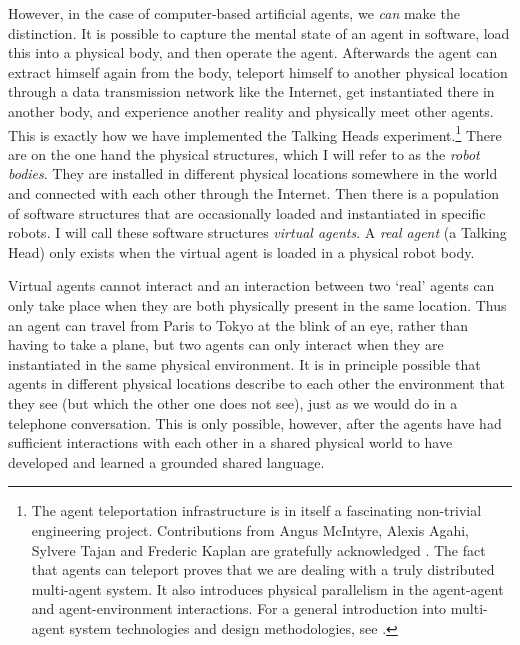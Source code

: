 However, in the case of computer-based 
artificial agents, we {\it can} 
make the distinction. It is possible to capture the mental state
of an agent in software, load this into a physical 
body, and then operate 
the agent. Afterwards the agent can extract himself
again from the body, teleport himself 
to another physical location through a data transmission network
like the Internet, get instantiated there in another
body, and experience another reality and physically meet
other agents. This is exactly how we have implemented the 
Talking Heads experiment.\footnote{
The agent teleportation infrastructure is in itself a 
fascinating non-trivial engineering project. Contributions 
from Angus McIntyre, Alexis Agahi, Sylvere Tajan and
Frederic Kaplan are gratefully acknowledged \cite{McIntyre:1999}. 
The fact that agents can teleport proves that we are dealing 
with a truly distributed multi-agent system. It also 
introduces physical parallelism in the agent-agent and 
agent-environment interactions. 
For a general introduction into multi-agent system
technologies and design methodologies, 
see \cite{Ferber:1999}.}
There are on the one hand
the physical structures, which I will refer to as the {\it
robot bodies}. They are installed in different physical 
locations somewhere in the world and connected
with each other through the Internet. Then there is 
a population of software structures that 
are occasionally loaded and instantiated in specific
robots. I will call these software structures
{\it virtual agents}. 
A {\it real agent} (a Talking Head) 
only exists when the virtual agent is
loaded in a physical robot body. 

Virtual agents cannot interact and 
an interaction between two `real' agents
can only take place when they are both physically present
in the same location. Thus an agent can travel from
Paris to Tokyo at the blink of an eye, rather than having
to take a plane, but two agents can only interact when they
are instantiated in the same physical environment. 
It is in principle possible that agents in different 
physical locations describe to each other the environment that they 
see (but which the other one does not see), just as we 
would do in a telephone conversation. This is only possible,
however, after the agents have had sufficient interactions
with each other in a shared physical world to have 
developed and learned a grounded shared language. 

